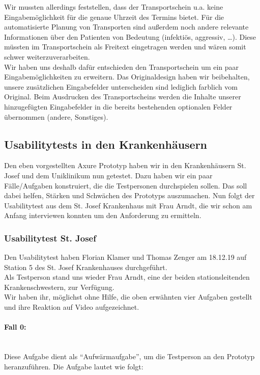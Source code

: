 \documentclass[a4paper, ngerman, 12pt]{scrartcl}
\begin{document}
Wir mussten allerdings feststellen, dass der Transportschein u.a. keine Eingabemöglichkeit für die genaue Uhrzeit des Termins bietet. Für die automatisierte Planung von Transporten sind außerdem noch andere relevante Informationen über den Patienten von Bedeutung (infektiös, aggressiv, …). Diese müssten im Transportschein als Freitext eingetragen werden und wären somit schwer weiterzuverarbeiten.\\

Wir haben uns deshalb dafür entschieden den Transportschein um ein paar Eingabemöglichkeiten zu erweitern. Das Originaldesign haben wir beibehalten, unsere zusätzlichen Eingabefelder unterscheiden sind lediglich farblich vom Original. Beim Ausdrucken des Transportscheins werden die Inhalte unserer hinzugefügten Eingabefelder in die bereits bestehenden optionalen Felder übernommen (andere, Sonstiges).
\subsection{Usabilitytests in den Krankenhäusern}
Den eben vorgestellten Axure Prototyp haben wir in den Krankenhäusern St. Josef und dem Uniklinikum nun getestet. Dazu haben wir ein paar Fälle/Aufgaben konstruiert, die die Testpersonen durchspielen sollen. Das soll dabei helfen, Stärken und Schwächen des Prototyps auszumachen. Nun folgt der Usabilitytest aus dem St. Josef Krankenhaus mit Frau Arndt, die wir schon am Anfang interviewen konnten um den Anforderung zu ermitteln.
\subsubsection{Usabilitytest St. Josef}
Den Usabilitytest haben Florian Klamer und Thomas Zenger am 18.12.19 auf Station 5 des St. Josef Krankenhauses durchgeführt.\\
Als Testperson stand uns wieder Frau Arndt, eine der beiden stationsleitenden Krankenschwestern, zur Verfügung.\\
Wir haben ihr, möglichst ohne Hilfe, die oben erwähnten vier Aufgaben gestellt und ihre Reaktion auf Video aufgezeichnet.\\
\paragraph{Fall 0:}\leavevmode\\
Diese Aufgabe dient als ``Aufwärmaufgabe'', um die Testperson an den Prototyp heranzuführen. Die Aufgabe lautet wie folgt:\\
\end{document}
